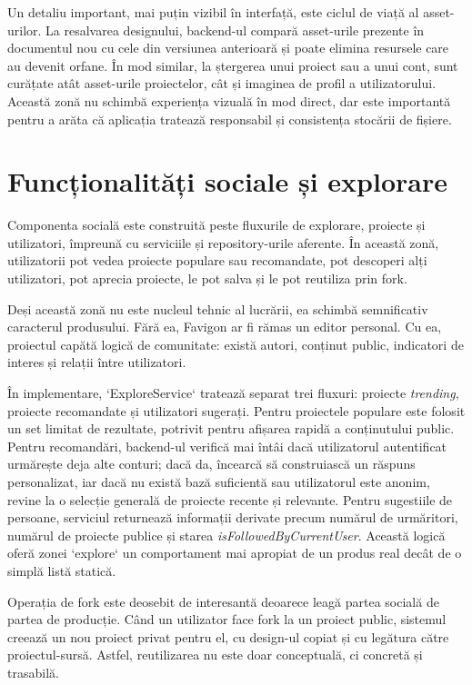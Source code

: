 Un detaliu important, mai puțin vizibil în interfață, este ciclul de viață al asset-urilor. La resalvarea designului, backend-ul compară asset-urile prezente în documentul nou cu cele din versiunea anterioară și poate elimina resursele care au devenit orfane. În mod similar, la ștergerea unui proiect sau a unui cont, sunt curățate atât asset-urile proiectelor, cât și imaginea de profil a utilizatorului. Această zonă nu schimbă experiența vizuală în mod direct, dar este importantă pentru a arăta că aplicația tratează responsabil și consistența stocării de fișiere.

\section{Funcționalități sociale și explorare}

Componenta socială este construită peste fluxurile de explorare, proiecte și utilizatori, împreună cu serviciile și repository-urile aferente. În această zonă, utilizatorii pot vedea proiecte populare sau recomandate, pot descoperi alți utilizatori, pot aprecia proiecte, le pot salva și le pot reutiliza prin fork.

Deși această zonă nu este nucleul tehnic al lucrării, ea schimbă semnificativ caracterul produsului. Fără ea, Favigon ar fi rămas un editor personal. Cu ea, proiectul capătă logică de comunitate: există autori, conținut public, indicatori de interes și relații între utilizatori.

În implementare, `ExploreService` tratează separat trei fluxuri: proiecte \textit{trending}, proiecte recomandate și utilizatori sugerați. Pentru proiectele populare este folosit un set limitat de rezultate, potrivit pentru afișarea rapidă a conținutului public. Pentru recomandări, backend-ul verifică mai întâi dacă utilizatorul autentificat urmărește deja alte conturi; dacă da, încearcă să construiască un răspuns personalizat, iar dacă nu există bază suficientă sau utilizatorul este anonim, revine la o selecție generală de proiecte recente și relevante. Pentru sugestiile de persoane, serviciul returnează informații derivate precum numărul de urmăritori, numărul de proiecte publice și starea \textit{isFollowedByCurrentUser}. Această logică oferă zonei `explore` un comportament mai apropiat de un produs real decât de o simplă listă statică.

Operația de fork este deosebit de interesantă deoarece leagă partea socială de partea de producție. Când un utilizator face fork la un proiect public, sistemul creează un nou proiect privat pentru el, cu design-ul copiat și cu legătura către proiectul-sursă. Astfel, reutilizarea nu este doar conceptuală, ci concretă și trasabilă.


